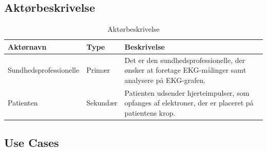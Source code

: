 \subsection{Aktørbeskrivelse}

\begin{table}[H]
\begin{tabularx}{\textwidth}{l l X}
    \toprule
     Aktørnavn  & Type      & Beskrivelse \\ \midrule
     Sundhedsprofessionelle   & Primær    & Det er den sundhedsprofessionelle, der ønsker at foretage EKG-målinger samt analysere på EKG-grafen.\\ 						  									  \addlinespace[2mm]
     Patienten & Sekundær  & Patienten udsender hjerteimpulser, som opfanges af elektroner, der er placeret på patientens krop.\\                                                                                                                                                                            
   
     \bottomrule                                                                                                                   
    \end{tabularx}
    \caption {Aktørbeskrivelse}
    \label{tab:aktoerbeskrivelse}
	
\end{table}

\subsection{Use Cases}

